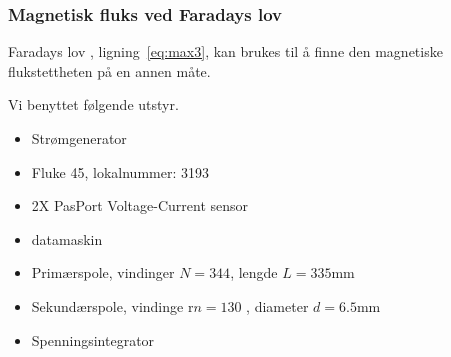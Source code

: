 \documentclass[a4paper,11pt, twocolumn]{article}
\begin{document}
\subsubsection{Magnetisk fluks ved Faradays lov}
Faradays lov , ligning~\eqref{eq:max3}, kan brukes til å finne den magnetiske flukstettheten på en annen måte.

Vi benyttet følgende utstyr.
\begin{itemize}
	\item Strømgenerator
	\item Fluke 45, lokalnummer: 3193
	\item 2X PasPort Voltage-Current sensor
	\item datamaskin
	\item Primærspole, vindinger $N = 344$, lengde $L = 335$mm 
	\item Sekundærspole, vindinge r$n = 130$ , diameter $d = 6.5$mm 
	\item Spenningsintegrator
\end{itemize}
\end{document}
